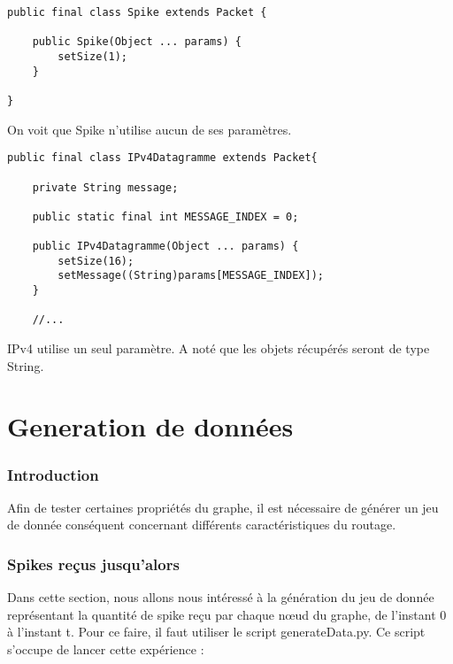 \documentclass{report}
\begin{document}
\begin{verbatim}
public final class Spike extends Packet {

    public Spike(Object ... params) {
        setSize(1);
    }

}
\end{verbatim}

On voit que Spike n'utilise aucun de ses paramètres.\\

\begin{verbatim}
public final class IPv4Datagramme extends Packet{
	
	private String message;
	
	public static final int MESSAGE_INDEX = 0;
	
	public IPv4Datagramme(Object ... params) {
        setSize(16); 
        setMessage((String)params[MESSAGE_INDEX]);
	}
	
	//...
\end{verbatim}

IPv4 utilise un seul paramètre. A noté que les objets récupérés seront de type String.\\


\part{Generation de données}

\section{Introduction}

Afin de tester certaines propriétés du graphe, il est nécessaire de générer un jeu de donnée conséquent concernant différents caractéristiques du routage.

\section{Spikes reçus jusqu'alors}

Dans cette section, nous allons nous intéressé à la génération du jeu de donnée représentant la quantité de spike reçu par chaque nœud du graphe, de l'instant 0 à l'instant t.
Pour ce faire, il faut utiliser le script generateData.py.
Ce script s'occupe de lancer cette expérience :\\
\end{document}
